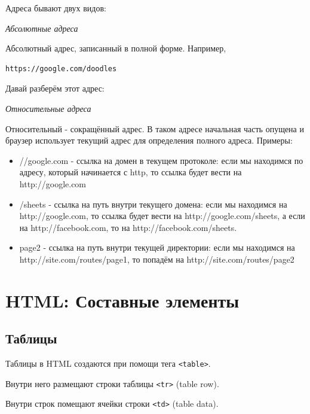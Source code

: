 \documentclass[14pt]{extreport}
\begin{document}
Адреса бывают двух видов:

\emph{Абсолютные адреса}

Абсолютный адрес, записанный в полной форме. Например,
\begin{verbatim}
https://google.com/doodles
\end{verbatim}
Давай разберём этот адрес:

\emph{Относительные адреса}

Относительный - сокращённый адрес. В таком адресе начальная часть опущена и браузер использует текущий адрес для определения полного адреса. Примеры:
\begin{itemize}
\item//google.com - ссылка на домен в текущем протоколе: если мы находимся по адресу, который начинается с http, то ссылка будет вести на http://google.com
\item/sheets - ссылка на путь внутри текущего домена: если мы находимся на http://google.com, то ссылка будет вести на http://google.com/sheets, а если на http://facebook.com, то на http://facebook.com/sheets.
\item page2 - ссылка на путь внутри текущей директории: если мы находимся на http://site.com/routes/page1, то попадём на http://site.com/routes/page2
\end{itemize}




\chapter{HTML: Составные элементы}

\section{Таблицы}

Таблицы в HTML создаются при помощи тега \texttt{<table>}.

Внутри него размещают строки таблицы \texttt{<tr>} (table row).

Внутри строк помещают ячейки строки \texttt{<td>} (table data).
\end{document}
